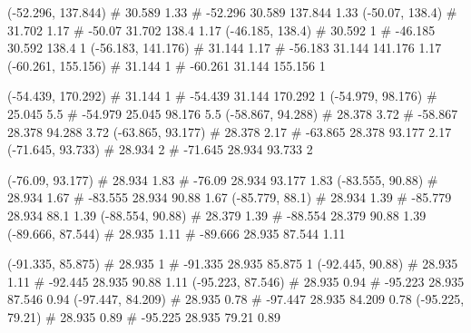 \documentclass[a4paper,openbib,10pt]{article}
\newenvironment{treegraph}{\begin{graph}}{\end{graph}}
\begin{document}
\begin{treegraph}
  (-52.296, 137.844) #     30.589    1.33
   #    -52.296    30.589    137.844    1.33
  (-50.07, 138.4) #     31.702    1.17
   #    -50.07    31.702    138.4    1.17
  (-46.185, 138.4) #     30.592    1
   #    -46.185    30.592    138.4    1
  (-56.183, 141.176) #     31.144    1.17
   #    -56.183    31.144    141.176    1.17
  (-60.261, 155.156) #     31.144    1
   #    -60.261    31.144    155.156    1

  (-54.439, 170.292) #     31.144    1
   #    -54.439    31.144    170.292    1
  (-54.979, 98.176) #     25.045    5.5
   #    -54.979    25.045    98.176    5.5
  (-58.867, 94.288) #     28.378    3.72
   #    -58.867    28.378    94.288    3.72
  (-63.865, 93.177) #     28.378    2.17
   #    -63.865    28.378    93.177    2.17
  (-71.645, 93.733) #     28.934    2
   #    -71.645    28.934    93.733    2

  (-76.09, 93.177) #     28.934    1.83
   #    -76.09    28.934    93.177    1.83
  (-83.555, 90.88) #     28.934    1.67
   #    -83.555    28.934    90.88    1.67
  (-85.779, 88.1) #     28.934    1.39
   #    -85.779    28.934    88.1    1.39
  (-88.554, 90.88) #     28.379    1.39
   #    -88.554    28.379    90.88    1.39
  (-89.666, 87.544) #     28.935    1.11
   #    -89.666    28.935    87.544    1.11

  (-91.335, 85.875) #     28.935    1
   #    -91.335    28.935    85.875    1
  (-92.445, 90.88) #     28.935    1.11
   #    -92.445    28.935    90.88    1.11
  (-95.223, 87.546) #     28.935    0.94
   #    -95.223    28.935    87.546    0.94
  (-97.447, 84.209) #     28.935    0.78
   #    -97.447    28.935    84.209    0.78
  (-95.225, 79.21) #     28.935    0.89
   #    -95.225    28.935    79.21    0.89


\end{treegraph}
\end{document}
